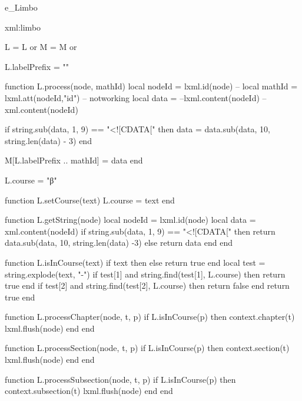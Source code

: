 \startenvironment e_Limbo
\unprotect




%
%
%
%

\startxmlsetups xml:limbo
\stopxmlsetups 


\startluacode 
    L = L or {}
    M = M or {}
    
    L.labelPrefix = ""
    
function L.process(node, mathId) 
  local nodeId = lxml.id(node)
  -- local mathId = lxml.att(nodeId,"id") -- notworking
  local data = --lxml.content(nodeId) --
  xml.content(nodeId)


  if string.sub(data, 1, 9) == "<![CDATA[" then data = data.sub(data, 10, string.len(data) - 3) end

  M[L.labelPrefix .. mathId] = data
end 

 L.course = "β"

 function L.setCourse(text)
   L.course = text
 end
 
 function L.getString(node)
  local nodeId = lxml.id(node)
  local data = xml.content(nodeId)
  if string.sub(data, 1, 9) == "<![CDATA[" then 
  	return data.sub(data, 10, string.len(data) -3) 
  else 
  	return data 
  end
end
 
 
function L.isInCourse(text)
  if text then else return true end
  local test = string.explode(text, "-")
  if test[1] and string.find(test[1], L.course) then return true end
  if test[2] and string.find(test[2], L.course) then return false end
  return true
end

function L.processChapter(node, t, p)
  if L.isInCourse(p) then 
  	context.chapter(t)
  	lxml.flush(node)
  end
end

function L.processSection(node, t, p)
  if L.isInCourse(p) then 
  	context.section(t)
  	lxml.flush(node)
  end
end

function L.processSubsection(node, t, p)
  if L.isInCourse(p) then 
  	context.subsection(t)
  	lxml.flush(node)
  end
end



